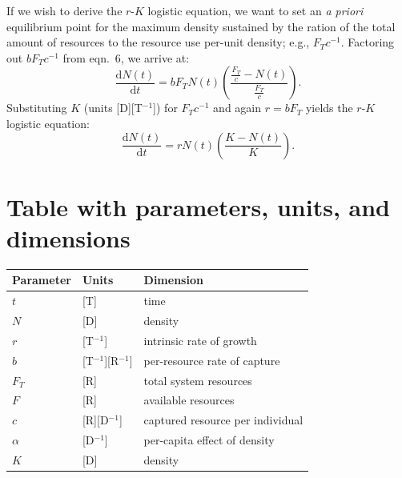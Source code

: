 \documentclass[11pt]{article}
\begin{document}
If we wish to derive the $r\textrm{-}K$ logistic equation, we want to set an \emph{a priori} equilibrium point for the maximum density sustained by the ration of the total amount of resources to the resource use per-unit density; e.g., $F_Tc^{-1}$. Factoring out $bF_Tc^{-1}$ from eqn.~6, we arrive at:
    \begin{equation}
    \frac{\mathrm{d}N(t)}{\mathrm{d}t} = bF_TN(t) \left(\frac{\frac{F_T}{c} - N(t)}{\frac{F_T}{c}}\right).
    \end{equation}
Substituting $K$ (units [D][T$^{-1}$]) for $F_Tc^{-1}$ and again $r = bF_T$ yields the $r\textrm{-}K$ logistic equation:
    \begin{equation}
    \frac{\mathrm{d}N(t)}{\mathrm{d}t} = rN(t) \left(\frac{K- N(t)}{K}\right).
    \end{equation}

\section{Table with parameters, units, and dimensions}
\begin{tabular}{l l l}
\hline
Parameter & Units & Dimension \\
\hline
$t$ & [T] & time \\
$N$ & [D] & density \\
$r$ & [T$^{-1}$] & intrinsic rate of growth\\
$b$ & [T$^{-1}$][R$^{-1}$] & per-resource rate of capture\\
$F_T$& [R] & total system resources \\
$F$ & [R] & available resources \\
$c$ & [R][D$^{-1}$] & captured resource per individual\\
$\alpha$ & [D$^{-1}$] & per-capita effect of density \\
$K$ & [D] & density \\
\hline
\end{tabular}


    
\end{document}
